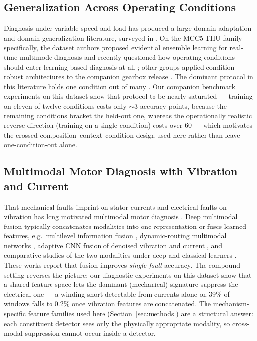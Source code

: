 \subsection{Generalization Across Operating Conditions}

Diagnosis under variable speed and load has produced a large domain-adaptation
and domain-generalization literature, surveyed in \cite{han2025}. On the
MCC5-THU family specifically, the dataset authors proposed evidential ensemble
learning for real-time multimode diagnosis \cite{liu2024tii} and recently
questioned how operating conditions should enter learning-based diagnosis at
all \cite{rethinking2025}; other groups applied condition-robust architectures
to the companion gearbox release \cite{wang2024,phmap2025}. The dominant
protocol in this literature holds one condition out of many
\cite{han2025,domainshift2025}. Our companion benchmark experiments on this
dataset show that protocol to be nearly saturated --- training on eleven of
twelve conditions costs only ${\sim}3$ accuracy points, because the remaining
conditions bracket the held-out one, whereas the operationally realistic
reverse direction (training on a single condition) costs over 60 --- which
motivates the crossed composition--context--condition design used here rather
than leave-one-condition-out alone.

\subsection{Multimodal Motor Diagnosis with Vibration and Current}

That mechanical faults imprint on stator currents and electrical faults on
vibration has long motivated multimodal motor diagnosis
\cite{mcsa_review2017}. Deep multimodal fusion typically concatenates
modalities into one representation or fuses learned features, e.g.\ multilevel
information fusion \cite{multilevel2019}, dynamic-routing multimodal networks
\cite{drmnn2020}, adaptive CNN fusion of denoised vibration and current
\cite{plos2025}, and comparative studies of the two modalities under deep and
classical learners \cite{ayankoso2026}. These works report that fusion improves
\emph{single-fault} accuracy. The compound setting reverses the picture: our
diagnostic experiments on this dataset show that a shared feature space lets
the dominant (mechanical) signature suppress the electrical one --- a winding
short detectable from currents alone on 39\% of windows falls to 0.2\% once
vibration features are concatenated. The mechanism-specific feature families
used here (Section~\ref{sec:methods}) are a structural answer: each constituent
detector sees only the physically appropriate modality, so cross-modal
suppression cannot occur inside a detector.

